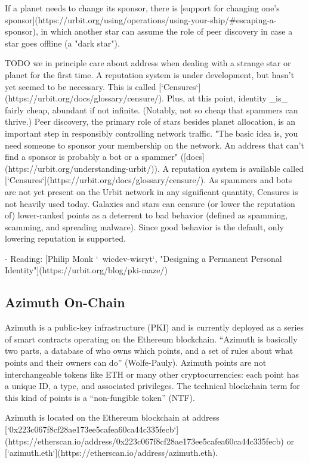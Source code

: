 {{{If a planet needs to change its sponsor, there is [support for changing one's sponsor](https://urbit.org/using/operations/using-your-ship/#escaping-a-sponsor), in which another star can assume the role of peer discovery in case a star goes offline (a "dark star").

TODO we in principle care about address when dealing with a strange star or planet for the first time.  A reputation system is under development, but hasn't yet seemed to be necessary.  This is called [`Censures`](https://urbit.org/docs/glossary/censure/).  Plus, at this point, identity _is_ fairly cheap, abundant if not infinite.  (Notably, not so cheap that spammers can thrive.)
Peer discovery, the primary role of stars besides planet allocation, is an important step in responsibly controlling network traffic.  "The basic idea is, you need someone to sponsor your membership on the network. An address that can't find a sponsor is probably a bot or a spammer" ([docs](https://urbit.org/understanding-urbit/)).
A reputation system is available called [`Censures`](https://urbit.org/docs/glossary/censure/).  As spammers and bots are not yet present on the Urbit network in any significant quantity, Censures is not heavily used today.  Galaxies and stars can censure (or lower the reputation of) lower-ranked points as a deterrent to bad behavior (defined as spamming, scamming, and spreading malware).  Since good behavior is the default, only lowering reputation is supported.

- Reading: [Philip Monk `~wicdev-wisryt`, "Designing a Permanent Personal Identity"](https://urbit.org/blog/pki-maze/)


\subsection{Azimuth On-Chain}

Azimuth is a public-key infrastructure (PKI) and is currently deployed as a series of smart contracts operating on the Ethereum blockchain.  ``Azimuth is basically two parts, a database of who owns which points, and a set of rules about what points and their owners can do'' (Wolfe-Pauly).  Azimuth points are not interchangeable tokens like ETH or many other cryptocurrencies:  each point has a unique ID, a type, and associated privileges.  The technical blockchain term for this kind of points is a ``non-fungible token'' (NTF).

Azimuth is located on the Ethereum blockchain at address [`0x223c067f8cf28ae173ee5cafea60ca44c335fecb`](https://etherscan.io/address/0x223c067f8cf28ae173ee5cafea60ca44c335fecb) or [`azimuth.eth`](https://etherscan.io/address/azimuth.eth).

}}}
